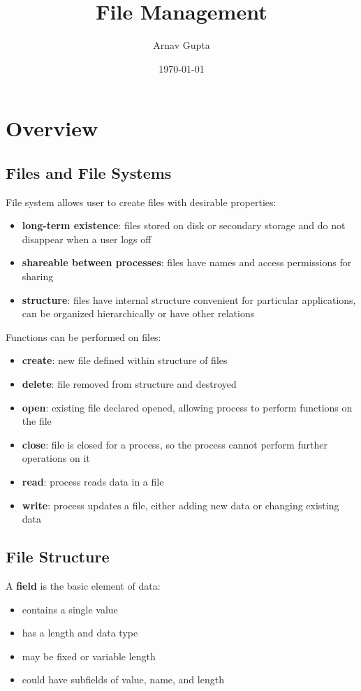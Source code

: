 \documentclass[11pt]{article}
\author{Arnav Gupta}
\date{\today}
\title{File Management}
\begin{document}
\maketitle
\tableofcontents

\section{Overview}
\label{sec:org62f74dc}
\subsection{Files and File Systems}
\label{sec:org0e98c1a}
File system allows user to create files with desirable properties:
\begin{itemize}
\item \textbf{long-term existence}: files stored on disk or secondary storage and do not disappear when
a user logs off
\item \textbf{shareable between processes}: files have names and access permissions for sharing
\item \textbf{structure}: files have internal structure convenient for particular applications, can be
organized hierarchically or have other relations
\end{itemize}

Functions can be performed on files:
\begin{itemize}
\item \textbf{create}: new file defined within structure of files
\item \textbf{delete}: file removed from structure and destroyed
\item \textbf{open}: existing file declared opened, allowing process to perform functions on the file
\item \textbf{close}: file is closed for a process, so the process cannot perform further operations
on it
\item \textbf{read}: process reads data in a file
\item \textbf{write}: process updates a file, either adding new data or changing existing data
\end{itemize}
\subsection{File Structure}
\label{sec:orgbf82356}
A \textbf{field} is the basic element of data:
\begin{itemize}
\item contains a single value
\item has a length and data type
\item may be fixed or variable length
\item could have subfields of value, name, and length
\end{itemize}
\end{document}
